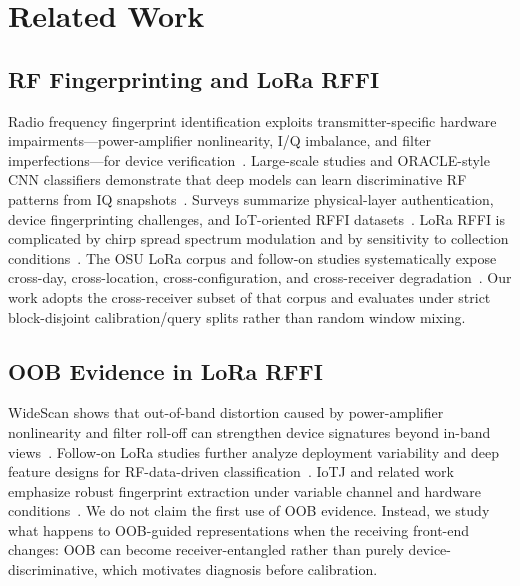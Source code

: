 \section{Related Work}
\label{sec:related}

\subsection{RF Fingerprinting and LoRa RFFI}
Radio frequency fingerprint identification exploits transmitter-specific hardware impairments---power-amplifier nonlinearity, I/Q imbalance, and filter imperfections---for device verification~\cite{brik2008wireless_device_id,jian2020deeplearning_rf_fingerprinting,riyaz2018deep_cnn_radio_id}.
Large-scale studies and ORACLE-style CNN classifiers demonstrate that deep models can learn discriminative RF patterns from IQ snapshots~\cite{sankhe2019oracle,jian2020deeplearning_rf_fingerprinting}.
Surveys summarize physical-layer authentication, device fingerprinting challenges, and IoT-oriented RFFI datasets~\cite{xie2021physical_layer_auth_survey,xu2015device_fingerprinting_survey,xie2024rffi_iot_survey,zhang2019phy_layer_security_iot}.
LoRa RFFI is complicated by chirp spread spectrum modulation and by sensitivity to collection conditions~\cite{shen2021lora_jsac,shen2021lora_spectrogram_cnn,alshawabka2021deeplora}.
The OSU LoRa corpus and follow-on studies systematically expose cross-day, cross-location, cross-configuration, and cross-receiver degradation~\cite{elmaghbub2021lora_wild,hamdaoui2022deeplearning,elmaghbub2021dataset_release,ahmed2024lora_rffi_survey}.
Our work adopts the cross-receiver subset of that corpus and evaluates under strict block-disjoint calibration/query splits rather than random window mixing.

\subsection{OOB Evidence in LoRa RFFI}
WideScan shows that out-of-band distortion caused by power-amplifier nonlinearity and filter roll-off can strengthen device signatures beyond in-band views~\cite{elmaghbub2020widescan}.
Follow-on LoRa studies further analyze deployment variability and deep feature designs for RF-data-driven classification~\cite{hamdaoui2022deeplearning,hamdaoui2020deep_nn_features,elmaghbub2021lora_wild}.
IoTJ and related work emphasize robust fingerprint extraction under variable channel and hardware conditions~\cite{zhou2021robust_rffi_iotj,xie2018coherent_rff_iotj}.
We do not claim the first use of OOB evidence.
Instead, we study what happens to OOB-guided representations when the receiving front-end changes: OOB can become receiver-entangled rather than purely device-discriminative, which motivates diagnosis before calibration.

